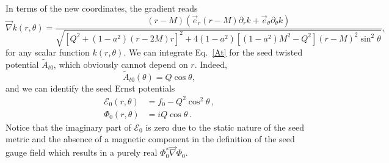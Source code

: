 \documentclass[aps,preprint,groupedaddress,nofootinbib,superscriptaddress,showkeys,showpacs,eqsecnum,amsmath,amssymb]{revtex4-1}
\newcommand{\ernst}{\mathcal{E}}
\begin{document}
In terms of the new coordinates, the gradient reads 
\begin{equation}
    \vec{\nabla}k(r,\theta) = \frac{(r-M)\left(\vec{e}_r (r-M)\partial_r k + \vec{e}_\theta \partial_\theta k \right)}{\sqrt{\left[ Q^2+(1-a^2)(r-2M) r \right]^2 +4(1-a^2)\left[ (1-a^2)M^2 - Q^2\right](r-M)^2\sin^2\theta}},
\end{equation}
for any scalar function $k(r,\theta)$. We can integrate Eq.~\eqref{At} for the seed twisted potential $\tilde{A}_{t0}$, which obviously cannot depend on $r$. Indeed, 
\begin{equation}
    \tilde{A}_{t0}(\theta) = Q\cos\theta,
\end{equation}
and we can identify the seed Ernst potentials 
\begin{subequations}
\begin{align}
\ernst_0(r,\theta) &= f_0 - Q^2 \cos^2\theta \,, \\
\Phi_0(r,\theta) &= iQ \cos\theta \,.
\end{align}
\end{subequations}
Notice that the imaginary part of $\ernst_0$ is zero due to the static nature of the seed metric and the absence of a magnetic component in the definition of the seed gauge field which results in a purely real $\Phi_0^\ast \vec{\nabla}\Phi_0$.
\end{document}
